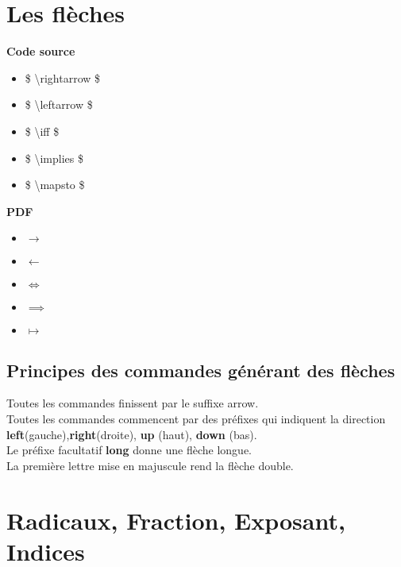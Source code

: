 \documentclass[a4paper,12pt]{article}
\begin{document}
\section{Les fl\`eches}
\begin{minipage}[t]{8cm}	
\textbf{Code source}\\
\begin{itemize}
\item \$ \textbackslash rightarrow \$
\item \$ \textbackslash leftarrow \$
\item \$ \textbackslash iff \$
\item \$ \textbackslash implies \$
\item \$ \textbackslash mapsto \$
\end{itemize}
\end{minipage}
\begin{minipage}[t]{8cm}
\textbf{PDF}\\
\begin{itemize}
\item $\rightarrow$
\item $\leftarrow$	
\item $\iff$
\item $\implies$
\item $\mapsto$
\end{itemize}
\end{minipage}
\subsection{Principes des commandes g\'en\'erant des fl\`eches}
Toutes les commandes finissent par le suffixe arrow.\\
Toutes les commandes commencent par des pr\'efixes qui indiquent la direction
\textbf{left}(gauche),\textbf{right}(droite), \textbf{up} (haut), \textbf{down} (bas).\\
 Le pr\'efixe facultatif \textbf{long} donne une fl\`eche longue.\\
La premi\`ere lettre mise en majuscule rend la fl\`eche double.
\section{Radicaux, Fraction, Exposant, Indices}
\end{document}
